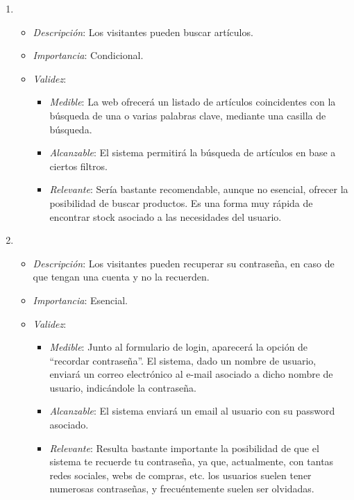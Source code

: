 \begin{enumerate}[{\bf RF-1}]
\item 
  \begin{itemize}
  \item \textit{Descripción}: Los visitantes pueden buscar artículos.
  \item \textit{Importancia}: Condicional.
  \item \textit{Validez}:
    \begin{itemize}
    \item \textit{Medible}: La web ofrecerá un listado de artículos coincidentes con la búsqueda de una o varias palabras clave, mediante una casilla de búsqueda.
    \item \textit{Alcanzable}: El sistema permitirá la búsqueda de artículos en base a ciertos filtros.
    \item \textit{Relevante}: Sería bastante recomendable, aunque no esencial, ofrecer la posibilidad de buscar productos. Es una forma muy rápida de encontrar stock asociado a las necesidades del usuario.
    \end{itemize}
  \end{itemize}

\item 
  \begin{itemize}
  \item \textit{Descripción}: Los visitantes pueden recuperar su contraseña, en caso de que tengan una cuenta y no la recuerden.
  \item \textit{Importancia}: Esencial.
  \item \textit{Validez}:
    \begin{itemize}
    \item \textit{Medible}: Junto al formulario de login, aparecerá la opción de ``recordar contraseña''. El sistema, dado un nombre de usuario, enviará un correo electrónico al e-mail asociado a dicho nombre de usuario, indicándole la contraseña.
    \item \textit{Alcanzable}: El sistema enviará un email al usuario con su password asociado.
    \item \textit{Relevante}: Resulta bastante importante la posibilidad de que el sistema te recuerde tu contraseña, ya que, actualmente, con tantas redes sociales, webs de compras, etc. los usuarios suelen tener numerosas contraseñas, y frecuéntemente suelen ser olvidadas.
    \end{itemize}
  \end{itemize}


\end{enumerate}
